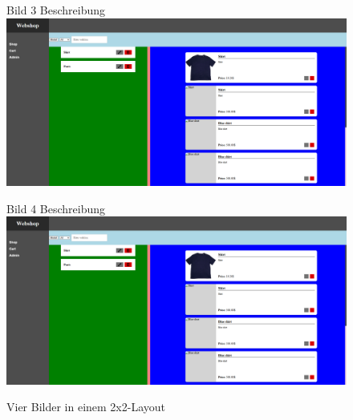 \begin{figure}[H]
    \begin{subcaptionbox}{Bild 3 Beschreibung\label{fig:bild3}}{
        \includegraphics[width=0.45\linewidth]{Images/webshop_4.png}}
    \end{subcaptionbox}
    \begin{subcaptionbox}{Bild 4 Beschreibung\label{fig:bild4}}{
        \includegraphics[width=0.45\linewidth]{Images/webshop_4.png}}
    \end{subcaptionbox}

    \caption{Vier Bilder in einem 2x2-Layout}
    \label{fig:vierBilder}
\end{figure}

